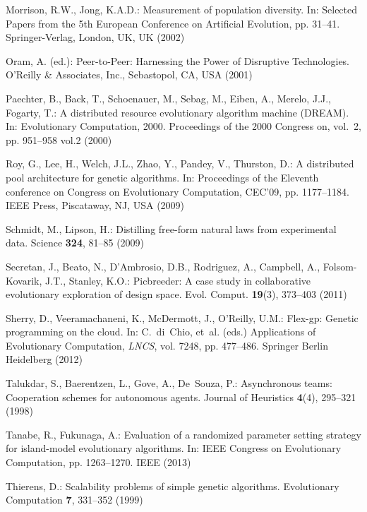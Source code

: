 \begin{thebibliography}{10}
Morrison, R.W., Jong, K.A.D.: Measurement of population diversity.
\newblock In: Selected Papers from the 5th European Conference on Artificial
  Evolution, pp. 31--41. Springer-Verlag, London, UK, UK (2002)

Oram, A. (ed.): Peer-to-Peer: Harnessing the Power of Disruptive Technologies.
\newblock O'Reilly \& Associates, Inc., Sebastopol, CA, USA (2001)

Paechter, B., Back, T., Schoenauer, M., Sebag, M., Eiben, A., Merelo, J.J.,
  Fogarty, T.: A distributed resource evolutionary algorithm machine ({DREAM}).
\newblock In: Evolutionary Computation, 2000. Proceedings of the 2000 Congress
  on, vol.~2, pp. 951--958 vol.2 (2000)

Roy, G., Lee, H., Welch, J.L., Zhao, Y., Pandey, V., Thurston, D.: A
  distributed pool architecture for genetic algorithms.
\newblock In: Proceedings of the Eleventh conference on Congress on
  Evolutionary Computation, CEC'09, pp. 1177--1184. IEEE Press, Piscataway, NJ,
  USA (2009)

Schmidt, M., Lipson, H.: Distilling free-form natural laws from experimental
  data.
\newblock Science \textbf{324}, 81--85 (2009)

Secretan, J., Beato, N., D'Ambrosio, D.B., Rodriguez, A., Campbell, A.,
  Folsom-Kovarik, J.T., Stanley, K.O.: Picbreeder: A case study in
  collaborative evolutionary exploration of design space.
\newblock Evol. Comput. \textbf{19}(3), 373--403 (2011)

Sherry, D., Veeramachaneni, K., McDermott, J., O'Reilly, U.M.: Flex-gp: Genetic
  programming on the cloud.
\newblock In: C.~di~Chio, et~al. (eds.) Applications of Evolutionary
  Computation, \emph{LNCS}, vol. 7248, pp. 477--486. Springer Berlin Heidelberg
  (2012)

Talukdar, S., Baerentzen, L., Gove, A., De~Souza, P.: Asynchronous teams:
  Cooperation schemes for autonomous agents.
\newblock Journal of Heuristics \textbf{4}(4), 295--321 (1998)

Tanabe, R., Fukunaga, A.: Evaluation of a randomized parameter setting strategy
  for island-model evolutionary algorithms.
\newblock In: IEEE Congress on Evolutionary Computation, pp. 1263--1270. IEEE
  (2013)

Thierens, D.: Scalability problems of simple genetic algorithms.
\newblock Evolutionary Computation \textbf{7}, 331--352 (1999)


\end{thebibliography}
